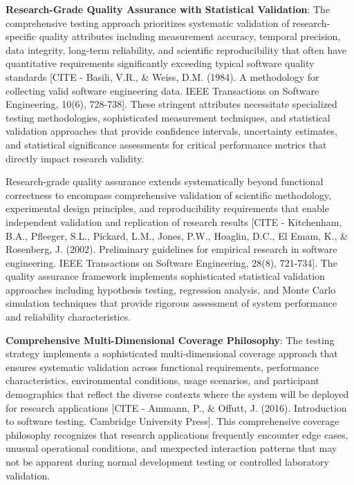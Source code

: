 \documentclass[11pt,a4paper]{report}
\begin{document}
\textbf{Research-Grade Quality Assurance with Statistical Validation}: The comprehensive testing approach prioritizes
systematic validation of research-specific quality attributes including measurement accuracy, temporal precision, data
integrity, long-term reliability, and scientific reproducibility that often have quantitative requirements significantly
exceeding typical software quality
standards [CITE - Basili, V.R., \& Weiss, D.M. (1984). A methodology for collecting valid software engineering data. IEEE Transactions on Software Engineering, 10(6), 728-738].
These stringent attributes necessitate specialized testing methodologies, sophisticated measurement techniques, and
statistical validation approaches that provide confidence intervals, uncertainty estimates, and statistical significance
assessments for critical performance metrics that directly impact research validity.

Research-grade quality assurance extends systematically beyond functional correctness to encompass comprehensive
validation of scientific methodology, experimental design principles, and reproducibility requirements that enable
independent validation and replication of research
results [CITE - Kitchenham, B.A., Pfleeger, S.L., Pickard, L.M., Jones, P.W., Hoaglin, D.C., El Emam, K., \& Rosenberg, J. (2002). Preliminary guidelines for empirical research in software engineering. IEEE Transactions on Software Engineering, 28(8), 721-734].
The quality assurance framework implements sophisticated statistical validation approaches including hypothesis testing,
regression analysis, and Monte Carlo simulation techniques that provide rigorous assessment of system performance and
reliability characteristics.

\textbf{Comprehensive Multi-Dimensional Coverage Philosophy}: The testing strategy implements a sophisticated
multi-dimensional coverage approach that ensures systematic validation across functional requirements, performance
characteristics, environmental conditions, usage scenarios, and participant demographics that reflect the diverse
contexts where the system will be deployed for research
applications [CITE - Ammann, P., \& Offutt, J. (2016). Introduction to software testing. Cambridge University Press].
This comprehensive coverage philosophy recognizes that research applications frequently encounter edge cases, unusual
operational conditions, and unexpected interaction patterns that may not be apparent during normal development testing
or controlled laboratory validation.
\end{document}

